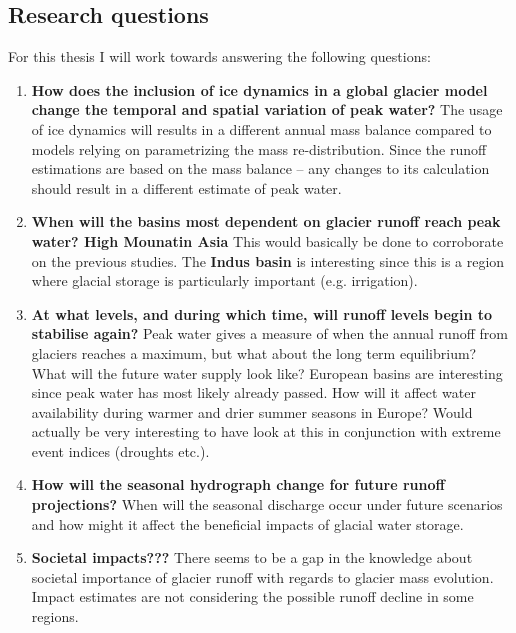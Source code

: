 \documentclass[12pt, a4paper]{article}
\begin{document}
\subsection{Research questions}
For this thesis I will work towards answering the following questions:
\begin{enumerate}
    \item \textbf{How does the inclusion of ice dynamics in a global glacier
    model change the temporal and spatial variation of peak water?} The usage of
    ice dynamics will results in a different annual mass balance compared to
    models relying on parametrizing the mass re-distribution. Since the runoff
    estimations are based on the mass balance -- any changes to its calculation
    should result in a different estimate of peak water.
    \item \textbf{When will the basins most dependent on glacier runoff reach
    peak water? High Mounatin Asia} This would basically be done to corroborate
    on the previous studies. The \textbf{Indus basin} is interesting since this
    is a region where glacial storage is particularly important (e.g.
    irrigation).
    \item \textbf{At what levels, and during which time, will runoff levels
    begin to stabilise again?} Peak water gives a measure of when the annual
    runoff from glaciers reaches a maximum, but what about the long term
    equilibrium? What will the future water supply look like? European basins
    are interesting since peak water has most likely already passed. How will it
    affect water availability during warmer and drier summer seasons in Europe?
    Would actually be very interesting to have look at this in conjunction with
    extreme event indices (droughts etc.).
    \item \textbf{How will the seasonal hydrograph change for future runoff
    projections?} When will the seasonal discharge occur under future scenarios
    and how might it affect the beneficial impacts of glacial water storage.
    \item \textbf{Societal impacts???} There seems to be a gap in the knowledge
    about societal importance of glacier runoff with regards to glacier mass
    evolution. Impact estimates are not considering the possible runoff decline
    in some regions.
\end{enumerate}
\end{document}
